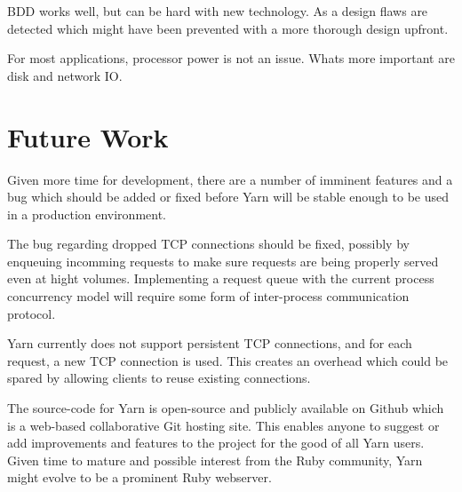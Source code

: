 BDD works well, but can be hard with new technology. As a design flaws are
detected which might have been prevented with a more thorough design upfront.

For most applications, processor power is not an issue. Whats more important
are disk and network IO.


\section{Future Work}
Given more time for development, there are a number of imminent features and
a bug which should be added or fixed before Yarn will be stable enough to be
used in a production environment.

The bug regarding dropped TCP connections should be fixed, possibly by
enqueuing incomming requests to make sure requests are being properly served
even at hight volumes. Implementing a request queue with the current process
concurrency model will require some form of inter-process communication
protocol.

Yarn currently does not support persistent TCP connections, and for each
request, a new TCP connection is used. This creates an overhead which could be
spared by allowing clients to reuse existing connections.

The source-code for Yarn is open-source and publicly available on Github which
is a web-based collaborative Git hosting site. This enables anyone to suggest
or add improvements and features to the project for the good of all Yarn
users. Given time to mature and possible interest from the Ruby community,
Yarn might evolve to be a prominent Ruby webserver.

